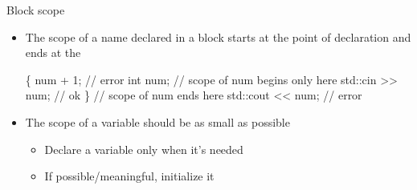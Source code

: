 \begin{frame}[fragile]{Block scope}

  \begin{itemize}[<+->]
  \item The scope of a name declared in a block starts at the point of
    declaration and ends at the \code{\}}

    \begin{codeblock}
\{
  num + 1;         // error
  int num;         // scope of num begins only here
  std::cin >> num; // ok
\}                  // scope of num ends here
std::cout << num;  // error\end{codeblock}

  \item<2-> The scope of a variable should be as small as possible
    \begin{itemize}
    \item Declare a variable only when it's needed
    \item If possible/meaningful, initialize it
    \end{itemize}
  \end{itemize}

\end{frame}


